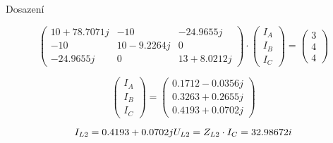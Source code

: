 Dosazení

$$
  \begin{pmatrix}
    10 + 78.7071j & -10         & -24.9655j    \\
    -10           & 10 -9.2264j & 0            \\
    -24.9655j     & 0           & 13 + 8.0212j
  \end{pmatrix}
  \cdot
  \begin{pmatrix}
    I_A \\
    I_B \\
    I_C
  \end{pmatrix}
  =
  \begin{pmatrix}
    3 \\
    4 \\
    4
  \end{pmatrix}
$$

$$
  \begin{pmatrix}
    I_A \\
    I_B \\
    I_C
  \end{pmatrix}
  =
  \begin{pmatrix}
    0.1712 - 0.0356j \\
    0.3263 + 0.2655j \\
    0.4193 + 0.0702j
  \end{pmatrix}
$$


$$
  I_{L2} = 0.4193 + 0.0702j \\
  U_{L2} = Z_{L2} \cdot I_C = 32.98672i
$$
